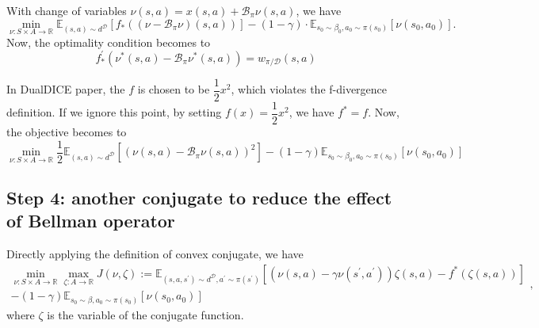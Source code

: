\documentclass[a4paper]{article}
\theoremstyle{definition}
\begin{document}
With change of variables $\nu(s, a)=x(s, a)+\mathcal{B}_{\pi} \nu(s, a)$, we have
\begin{equation}
\min _{\nu: S \times A \rightarrow \mathbb{R}} \mathbb{E}_{(s, a) \sim d^{\mathcal{D}}}\left[f_{*}\left(\left(\nu-\mathcal{B}_{\pi} \nu\right)(s, a)\right)\right]-(1-\gamma) \cdot \mathbb{E}_{s_{0} \sim \beta_{0}, a_{0} \sim \pi\left(s_{0}\right)}\left[\nu\left(s_{0}, a_{0}\right)\right].
\end{equation}
Now, the optimality condition becomes to 
\begin{equation}
f_{*}^{\prime}\left(\nu^{*}(s, a)-\mathcal{B}_{\pi} \nu^{*}(s, a)\right)=w_{\pi / \mathcal{D}}(s, a)
\end{equation}

{\color{red}In DualDICE paper, the $f$ is chosen to be $\dfrac{1}{2}x^2$, which violates the f-divergence definition.} If we ignore this point, by setting $f(x) = \dfrac{1}{2}x^2$, we have $f^* = f$. Now, the objective becomes to 
\begin{equation}
\min _{\nu: S \times A \rightarrow \mathbb{R}} \frac{1}{2} \mathbb{E}_{(s, a) \sim d^{\mathcal{D}}}\left[\left(\nu(s, a)-\mathcal{B}_{\pi} \nu(s, a)\right)^{2}\right]-(1-\gamma)\mathbb{E}_{s_{0} \sim \beta_{0}, a_{0} \sim \pi\left(s_{0}\right)}\left[\nu\left(s_{0}, a_{0}\right)\right]
\end{equation}

\subsection{Step 4: another conjugate to reduce the effect of Bellman operator}
Directly applying the definition of convex conjugate, we have
\begin{equation}
\begin{aligned} \min _{\nu: S \times A \rightarrow \mathbb{R}} \max _{\zeta:A \rightarrow \mathbb{R}} J(\nu, \zeta):=\mathbb{E}_{\left(s, a, s^{\prime}\right) \sim d^{\mathcal{D}}, a^{\prime} \sim \pi\left(s^{\prime}\right)}\left[\left(\nu(s, a)-\gamma \nu\left(s^{\prime}, a^{\prime}\right)\right) \zeta(s, a)-f^{*}(\zeta(s, a))\right] \\-(1-\gamma) \mathbb{E}_{s_{0} \sim \beta, a_{0} \sim \pi\left(s_{0}\right)}\left[\nu\left(s_{0}, a_{0}\right)\right] \end{aligned},
\end{equation}
where $\zeta$ is the variable of the conjugate function.
\end{document}
